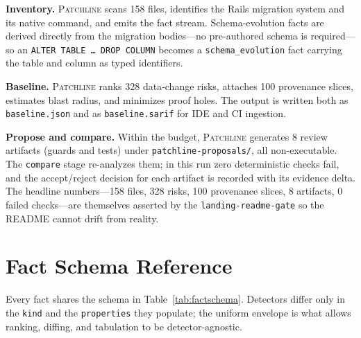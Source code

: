 \documentclass[11pt]{article}
\newcommand{\tool}{\textsc{Patchline}}
\newcommand{\code}[1]{\texttt{#1}}
\begin{document}
\noindent
\textbf{Inventory.} \tool{} scans 158 files, identifies the Rails migration system and its native
command, and emits the fact stream. Schema-evolution facts are derived directly from the migration
bodies---no pre-authored schema is required---so an \code{ALTER TABLE \dots\ DROP COLUMN} becomes a
\code{schema\_evolution} fact carrying the table and column as typed identifiers.

\noindent
\textbf{Baseline.} \tool{} ranks 328 data-change risks, attaches 100 provenance slices, estimates
blast radius, and minimizes proof holes. The output is written both as \code{baseline.json} and as
\code{baseline.sarif} for IDE and CI ingestion.

\noindent
\textbf{Propose and compare.} Within the budget, \tool{} generates 8 review artifacts (guards and
tests) under \code{patchline-proposals/}, all non-executable. The \code{compare} stage re-analyzes
them; in this run zero deterministic checks fail, and the accept/reject decision for each artifact is
recorded with its evidence delta. The headline numbers---158 files, 328 risks, 100 provenance slices,
8 artifacts, 0 failed checks---are themselves asserted by the \code{landing-readme-gate} so the
README cannot drift from reality.

\section{Fact Schema Reference}
\label{app:schema}

Every fact shares the schema in Table~\ref{tab:factschema}. Detectors differ only in the \code{kind}
and the \code{properties} they populate; the uniform envelope is what allows ranking, diffing, and
tabulation to be detector-agnostic.
\end{document}
